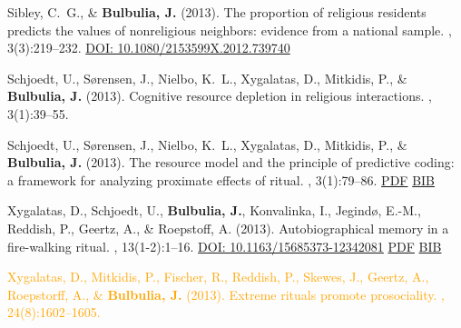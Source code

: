 \documentclass{article}
\begin{document}
\begin{thebibliography}{99}
Sibley, C.~G., \& {\bf Bulbulia, J.} (2013).
\newblock The proportion of religious residents predicts the values of
  nonreligious neighbors: evidence from a national sample.
, 3(3):219--232.
\href{https://doi.org/10.1080/2153599X.2012.739740}{DOI: 10.1080/2153599X.2012.739740}


Schjoedt, U., S{\o}rensen, J., Nielbo, K.~L., Xygalatas, D., Mitkidis, P., \&
  {\bf Bulbulia, J.} (2013).
\newblock Cognitive resource depletion in religious interactions.
, 3(1):39--55. 


Schjoedt, U., S{\o}rensen, J., Nielbo, K.~L., Xygalatas, D., Mitkidis, P., \&
  {\bf Bulbulia, J.} (2013).
\newblock The resource model and the principle of predictive coding: a
  framework for analyzing proximate effects of ritual.
, 3(1):79--86.
\href{https://www.dropbox.com/s/sqmgtkag4zbu3nc/schjoedtetall2013Framework.pdf?dl=0}{PDF} \href{https://scholar.google.co.nz/scholar.bib?q=info:DB2umFzhr70J:scholar.google.com/&output=citation&scisig=AAGBfm0AAAAAVTM86rinZ5ScIM9di3Db8hA7UdmttQQN&scisf=4&hl=en}{BIB}


Xygalatas, D., Schjoedt, U., {\bf Bulbulia, J.}, Konvalinka, I., Jegind{\o}, E.-M.,
  Reddish, P., Geertz, A., \& Roepstoff, A. (2013).
\newblock Autobiographical memory in a fire-walking ritual.
, 13(1-2):1--16. 
\href{https://doi.org/10.1163/15685373-12342081}{DOI: 10.1163/15685373-12342081}
\href{https://www.dropbox.com/s/3srdqka56fe7av3/JOCC_Xygalatas_et_al_2013.pdf}{PDF} \href{https://www.dropbox.com/s/yc0vqndj8w8hn05/2013.xygalat.memory.bib?dl=0}{BIB}


\textcolor{Orange}{Xygalatas, D., Mitkidis, P., Fischer, R., Reddish, P., Skewes, J., Geertz,
  A., Roepstorff, A., \& {\bf Bulbulia, J.} (2013).
\newblock Extreme rituals promote prosociality.
, 24(8):1602--1605.} %


\end{thebibliography}
\end{document}
